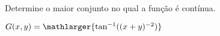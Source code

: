 
Determine o maior conjunto no qual a função é contínua.


$ G(x,y)=\mathlarger{\tan^{-1}((x+y)^{-2})}$